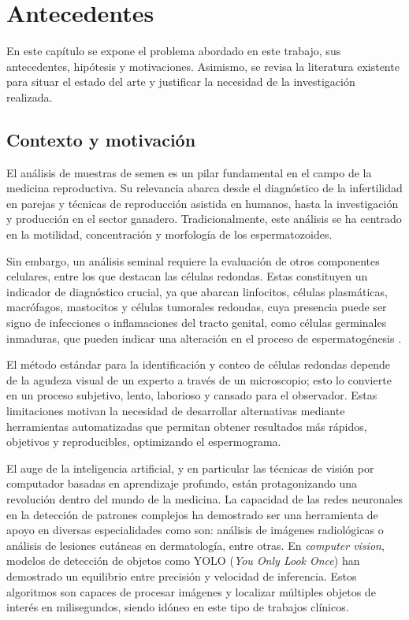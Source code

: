 \documentclass[12pt,a4paper,onecolumn,oneside]{report}
\begin{document}
\chapter{Antecedentes} %
\label{Antecedentes}

En este capítulo se expone el problema abordado en este trabajo, sus antecedentes, hipótesis y motivaciones. 
Asimismo, se revisa la literatura existente para situar el estado del arte y justificar la necesidad de la investigación realizada.

\section{Contexto y motivación}
\label{sec:Contexto y motivación}

El análisis de muestras de semen es un pilar fundamental en el campo de la medicina reproductiva. Su relevancia abarca desde el diagnóstico 
de la infertilidad en parejas y técnicas de reproducción asistida en humanos, hasta la investigación y producción en el sector ganadero. Tradicionalmente,
este análisis se ha centrado en la motilidad, concentración y morfología de los espermatozoides.

Sin embargo, un análisis seminal requiere la evaluación de otros componentes celulares, entre los que destacan las células redondas. 
Estas constituyen un indicador de diagnóstico crucial, ya que abarcan linfocitos, células plasmáticas, macrófagos, mastocitos y células tumorales redondas, cuya presencia puede ser signo de infecciones o inflamaciones 
del tracto genital, como células germinales inmaduras, que pueden indicar una alteración en el proceso de espermatogénesis \cite{HamiltonThorneRoundCells}.

El método estándar para la identificación y conteo de células redondas depende de la agudeza visual de un experto a través de un microscopio; esto lo convierte en
un proceso subjetivo, lento, laborioso y cansado para el observador. Estas limitaciones motivan la necesidad 
de desarrollar alternativas mediante herramientas automatizadas que permitan obtener resultados más rápidos, objetivos y reproducibles, optimizando el espermograma.

El auge de la inteligencia artificial, y en particular las técnicas de visión por computador basadas en aprendizaje profundo, están protagonizando una revolución dentro del mundo de la medicina.
La capacidad de las redes neuronales en la detección de patrones complejos ha demostrado ser una herramienta de apoyo en diversas especialidades como son: análisis de imágenes radiológicas o análisis de lesiones cutáneas en dermatología, entre otras.
En \textit{computer vision}, modelos de detección de objetos como YOLO (\textit{You Only Look Once}) \cite{ultralytics_models} han demostrado un equilibrio entre precisión y velocidad de inferencia. Estos algoritmos son capaces 
de procesar imágenes y localizar múltiples objetos de interés en milisegundos, siendo idóneo en este tipo de trabajos clínicos.
\end{document}
